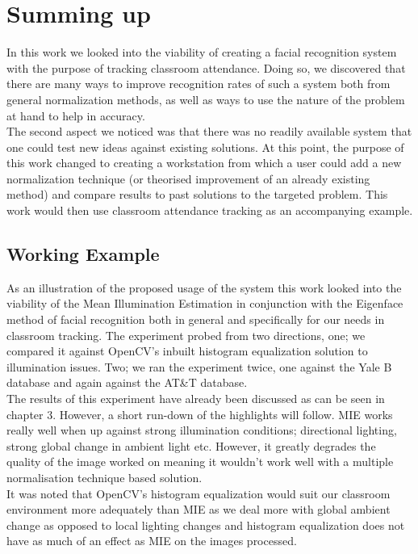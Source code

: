 \section{Summing up}
In this work we looked into the viability of creating a facial recognition system with the purpose 
of tracking classroom attendance.  Doing so, we discovered that there are many ways to improve 
recognition rates of such a system both from general normalization methods, as well as ways to use 
the nature of the problem at hand to help in accuracy. \\

The second aspect we noticed was that there was no readily available system that one could test new 
ideas against existing solutions.  At this point, the purpose of this work changed to creating a 
workstation from which a user could add a new normalization technique (or theorised improvement of 
an already existing method) and compare results to past solutions to the targeted problem.  This work
would then use classroom attendance tracking as an accompanying example.

\subsection{Working Example}
As an illustration of the proposed usage of the system this work looked into the viability of the 
Mean Illumination Estimation in conjunction with the Eigenface method of facial recognition both 
in general and specifically for our needs in classroom tracking.  The experiment probed from two 
directions, one; we compared it against OpenCV's inbuilt histogram equalization solution to 
illumination issues.  Two; we ran the experiment twice, one against the Yale B database and again 
against the AT\&T database. \\

The results of this experiment have already been discussed as can be seen in chapter 3.  However, 
a short run-down of the highlights will follow.  MIE works really well when up against strong 
illumination conditions;  directional lighting, strong global change in ambient light etc.  However, 
it greatly degrades the quality of the image worked on meaning it wouldn't work well with  a multiple 
normalisation technique based solution.  \\

It was noted that OpenCV's histogram equalization would suit our classroom environment more adequately 
than MIE as we deal more with global ambient change as opposed to local lighting changes and histogram 
equalization does not have as much of an effect as MIE on the images processed. \\

